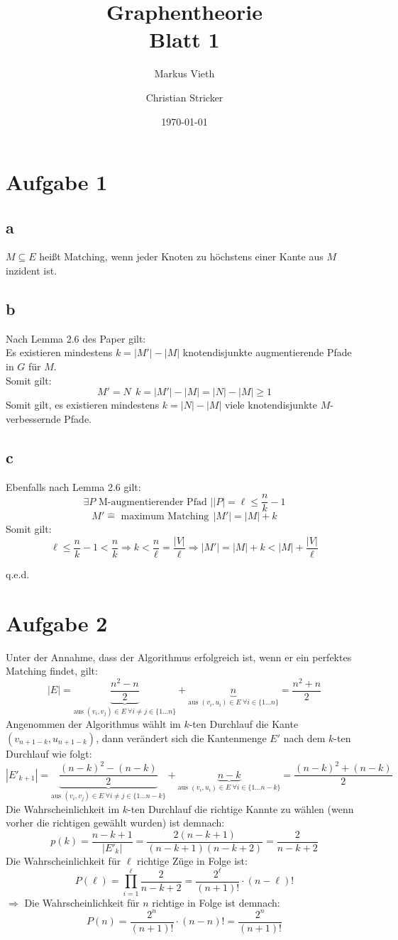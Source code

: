 \documentclass[a4paper,11pt,twoside]{scrartcl}
\title{Graphentheorie\\ Blatt 1}
\author{Markus Vieth\and Christian Stricker}
\date{\today}
\newcommand{\qed}{%
	\begin{flushright}
		q.e.d.
	\end{flushright}%
	}
\begin{document}
\maketitle
\cleardoublepage
\pagestyle{myheadings}

\newpage
\section*{Aufgabe 1}
\subsection*{a}
$M \subseteq E$ heißt Matching, wenn jeder Knoten zu höchstens einer Kante aus $M$ inzident ist.
\subsection*{b}
Nach Lemma 2.6 des Paper gilt:\\
Es existieren mindestens $k = |M'| - |M|$ knotendisjunkte augmentierende Pfade in $G$ für $M$.\\
Somit gilt:
\[ M' = N~~k = |M'| - |M| = |N| - |M| \geq 1 \]
Somit gilt, es existieren mindestens $k=|N| - |M|$ viele knotendisjunkte $M$-verbessernde Pfade.
\subsection*{c}
Ebenfalls nach Lemma 2.6 gilt:
\[ \exists P \text{ M-augmentierender Pfad } | |P| = \ell \leq \frac{n}{k} - 1  \]
\[ M' \hat{=} \text{ maximum Matching}~~|M'| = |M| + k \]
Somit gilt:
\[ \ell \leq \frac{n}{k} - 1 < \frac{n}{k} \Rightarrow k < \frac{n}{\ell} = \frac{|V|}{\ell} \Rightarrow |M'| = |M| + k < |M| + \frac{|V|}{\ell} \]
\qed
\section*{Aufgabe 2}
Unter der Annahme, dass der Algorithmus erfolgreich ist, wenn er ein perfektes Matching findet, gilt:
\[ |E| = \underset{\text{aus }(v_i,v_j) \in E ~\forall i\neq j \in \{1\ldots n\}}{\underbrace{\frac{n^2-n}{2}}} + \underset{\text{aus } (v_i,u_i) \in E ~\forall i\in\{ 1\ldots n \} }{\underbrace{n}}   = \frac{n^2+n}{2}\]
Angenommen der Algorithmus wählt im $k$-ten Durchlauf die Kante $(v_{n+1-k}, u_{n+1-k})$, dann verändert sich die Kantenmenge $E'$ nach dem $k$-ten Durchlauf wie folgt:
\[ |E'_{k+1}| = \underset{\text{aus }(v_i,v_j) \in E ~\forall i\neq j \in \{1\ldots n-k\}}{\underbrace{\frac{(n-k)^2-(n-k)}{2}}} + \underset{\text{aus } (v_i,u_i) \in E ~\forall i\in\{ 1\ldots n-k \} }{\underbrace{n-k}}   = \frac{(n-k)^2+(n-k)}{2}\]
Die Wahrscheinlichkeit im $k$-ten Durchlauf die richtige Kannte zu wählen (wenn vorher die richtigen gewählt wurden) ist demnach:
\[ p(k) = \frac{n-k+1}{|E'_k|} = \frac{2(n-k+1)}{(n-k+1)(n-k + 2)} = \frac{2}{n-k+2}  \]
Die Wahrscheinlichkeit für $\ell$ richtige Züge in Folge ist:
\[ P(\ell) = \prod_{i=1}^{\ell}\frac{2}{n-k+2} = \frac{2^\ell}{(n+1)!}\cdot(n-\ell)! \]
$\Rightarrow$ Die Wahrscheinlichkeit für $n$ richtige in Folge ist demnach:
\[ P(n) = \frac{2^n}{(n+1)!}\cdot(n-n)! = \frac{2^n}{(n+1)!} \]
\end{document}
